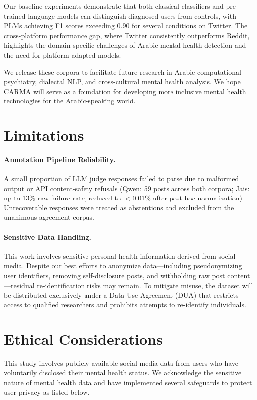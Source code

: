 \documentclass[11pt]{article}
\begin{document}
Our baseline experiments demonstrate that both classical classifiers and pre-trained language models can distinguish diagnosed users from controls, with PLMs achieving F1 scores exceeding 0.90 for several conditions on Twitter. The cross-platform performance gap, where Twitter consistently outperforms Reddit, highlights the domain-specific challenges of Arabic mental health detection and the need for platform-adapted models.

We release these corpora to facilitate future research in Arabic computational psychiatry, dialectal NLP, and cross-cultural mental health analysis. We hope CARMA will serve as a foundation for developing more inclusive mental health technologies for the Arabic-speaking world.






\section*{Limitations}
\paragraph{Annotation Pipeline Reliability.}
A small proportion of LLM judge responses failed to parse due to malformed output or API content-safety refusals (Qwen: 59 posts across both corpora; Jais: up to 13\% raw failure rate, reduced to $<$0.01\% after post-hoc normalization). Unrecoverable responses were treated as abstentions and excluded from the unanimous-agreement corpus.

\paragraph{Sensitive Data Handling.}
This work involves sensitive personal health information derived from social media. Despite our best efforts to anonymize data---including pseudonymizing user identifiers, removing self-disclosure posts, and withholding raw post content---residual re-identification risks may remain. To mitigate misuse, the dataset will be distributed exclusively under a Data Use Agreement (DUA) that restricts access to qualified researchers and prohibits attempts to re-identify individuals.


\section*{Ethical Considerations}
\label{sec:ethics}
This study involves publicly available social media data from users who have voluntarily disclosed their mental health status. We acknowledge the sensitive nature of mental health data and have implemented several safeguards to protect user privacy as listed below. 
\end{document}

